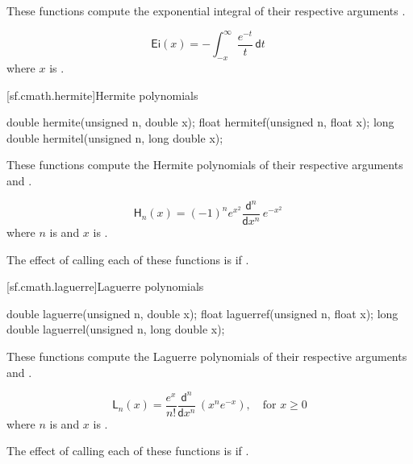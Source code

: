 \begin{itemdescr}

\pnum\effects
These functions compute the exponential integral
of their respective arguments
.

\pnum\returns
\[%
  \mathsf{Ei}(x) =
  - \int_{-x}^\infty \frac{e^{-t}}
                          {t     } \, \mathsf{d}t
\;
\]
where
$x$ is .

\end{itemdescr}

[sf.cmath.hermite]{Hermite polynomials}%
%
%
%
%
%
\begin{itemdecl}
double       hermite(unsigned n, double x);
float        hermitef(unsigned n, float x);
long double  hermitel(unsigned n, long double x);
\end{itemdecl}

\begin{itemdescr}
\pnum\effects
These functions compute the Hermite polynomials
of their respective arguments
 and .

\pnum\returns
\[%
  \mathsf{H}_n(x) =
  (-1)^n e^{x^2} \frac{ \mathsf{d} ^n}
		      { \mathsf{d}x^n} \, e^{-x^2}
\;
\]
where
$n$ is  and
$x$ is .

\pnum\remark
The effect of calling each of these functions
is 
if .
\end{itemdescr}

[sf.cmath.laguerre]{Laguerre polynomials}%
%
%
%
%
%
\begin{itemdecl}
double       laguerre(unsigned n, double x);
float        laguerref(unsigned n, float x);
long double  laguerrel(unsigned n, long double x);
\end{itemdecl}

\begin{itemdescr}

\pnum\effects
These functions compute the Laguerre polynomials
of their respective arguments
 and .

\pnum\returns
\[%
  \mathsf{L}_n(x) =
  \frac{e^x}{n!} \frac{ \mathsf{d} ^ n}
		    { \mathsf{d}x ^ n} \, (x^n e^{-x}),
	   \quad \mbox{for $x \ge 0$}
\]
where
$n$ is  and
$x$ is .

\pnum\remark
The effect of calling each of these functions
is 
if .
\end{itemdescr}

